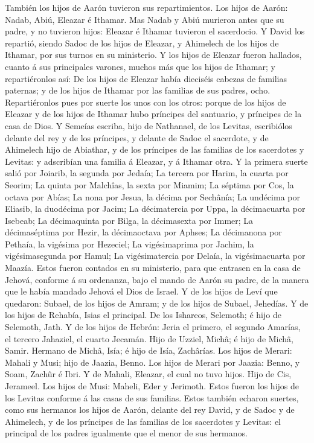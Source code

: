  También los hijos de Aarón tuvieron sus repartimientos. Los
hijos de Aarón: Nadab, Abiú, Eleazar é Ithamar.  Mas Nadab y
Abiú murieron antes que su padre, y no tuvieron hijos: Eleazar é Ithamar
tuvieron el sacerdocio.  Y David los repartió, siendo Sadoc
de los hijos de Eleazar, y Ahimelech de los hijos de Ithamar, por sus
turnos en su ministerio.  Y los hijos de Eleazar fueron
hallados, cuanto á sus principales varones, muchos más que los hijos de
Ithamar; y repartiéronlos así: De los hijos de Eleazar había dieciséis
cabezas de familias paternas; y de los hijos de Ithamar por las familias
de sus padres, ocho.  Repartiéronlos pues por suerte los
unos con los otros: porque de los hijos de Eleazar y de los hijos de
Ithamar hubo príncipes del santuario, y príncipes de la casa de Dios.
 Y Semeías escriba, hijo de Nathanael, de los Levitas,
escribiólos delante del rey y de los príncipes, y delante de Sadoc el
sacerdote, y de Ahimelech hijo de Abiathar, y de los príncipes de las
familias de los sacerdotes y Levitas: y adscribían una familia á
Eleazar, y á Ithamar otra.  Y la primera suerte salió por
Joiarib, la segunda por Jedaía;  La tercera por Harim, la
cuarta por Seorim;  La quinta por Malchîas, la sexta por
Miamim;  La séptima por Cos, la octava por Abías;
 La nona por Jesua, la décima por Sechânía; 
La undécima por Eliasib, la duodécima por Jacim;  La
décimatercia por Uppa, la décimacuarta por Isebeab;  La
décimaquinta por Bilga, la décimasexta por Immer;  La
décimaséptima por Hezir, la décimaoctava por Aphses;  La
décimanona por Pethaía, la vigésima por Hezeciel;  La
vigésimaprima por Jachim, la vigésimasegunda por Hamul;  La
vigésimatercia por Delaía, la vigésimacuarta por Maazía. 
Estos fueron contados en su ministerio, para que entrasen en la casa de
Jehová, conforme á su ordenanza, bajo el mando de Aarón su padre, de la
manera que le había mandado Jehová el Dios de Israel.  Y de
los hijos de Leví que quedaron: Subael, de los hijos de Amram; y de los
hijos de Subael, Jehedías.  Y de los hijos de Rehabía,
Isias el principal.  De los Ishareos, Selemoth; é hijo de
Selemoth, Jath.  Y de los hijos de Hebrón: Jeria el
primero, el segundo Amarías, el tercero Jahaziel, el cuarto Jecamán.
 Hijo de Uzziel, Michâ; é hijo de Michâ, Samir.
 Hermano de Michâ, Isía; é hijo de Isía, Zachârías.
 Los hijos de Merari: Mahali y Musi; hijo de Jaazia, Benno.
 Los hijos de Merari por Jaazia: Benno, y Soam, Zachûr é
Ibri.  Y de Mahali, Eleazar, el cual no tuvo hijos.
 Hijo de Cis, Jerameel.  Los hijos de Musi:
Maheli, Eder y Jerimoth. Estos fueron los hijos de los Levitas conforme
á las casas de sus familias.  Estos también echaron
suertes, como sus hermanos los hijos de Aarón, delante del rey David, y
de Sadoc y de Ahimelech, y de los príncipes de las familias de los
sacerdotes y Levitas: el principal de los padres igualmente que el menor
de sus hermanos.

